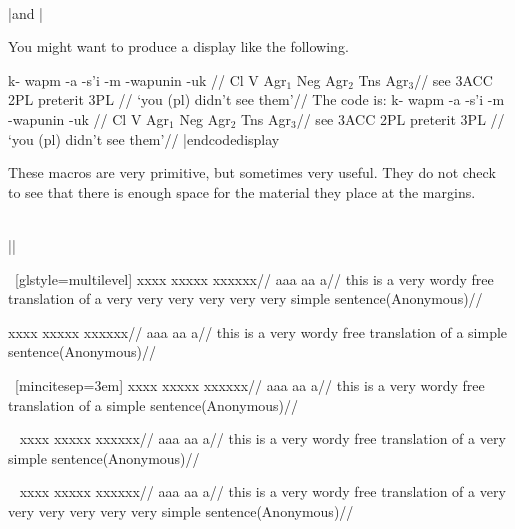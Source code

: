 \bigskip
\\ |\rightcomment and \leftcomment|\medskip

You might want to produce a display like the following.

\framedisplay
\ex[glstyle=multilevel,textoffset=1in]
\begingl
\gla \rightcomment{\rm [Potawatami]}k- wapm -a -s'i -m -wapunin -uk //
\glb {}%
   Cl V Agr$_1$ Neg Agr$_2$ Tns Agr$_3$//
 see {3\sc ACC} {} 2{\sc PL} preterit 3{\sc PL} //
\glft \leavevmode{}
   `you (pl) didn't see them'//
\endgl
\xe
\endframedisplay
The code is:
\codedisplay
\ex[glstyle=multilevel,textoffset=1.5in]
\begingl
\gla \rightcomment{\rm [Potawatami]}k- wapm -a -s'i -m -wapunin -uk //
\glb {}%
   Cl V Agr$_1$ Neg Agr$_2$ Tns Agr$_3$//
 see {3\sc ACC} {} 2{\sc PL} preterit 3{\sc PL} //
\glft \leavevmode{}
   `you (pl) didn't see them'//
\endgl
\xe
|endcodedisplay

These macros are very primitive, but sometimes very useful.  They
do not check to see that there is enough space for the material
they place at the margins.

\bigskip
\\ |\pushciteright|\medskip

\ex~[glstyle=multilevel]
\begingl
\gla xxxx xxxxx xxxxxx//
\glb aaa aa a//
\glft this is a very wordy free translation
of a very very very
very very very
simple sentence\hfill (Anonymous)//
\endgl
\xe


\ex
\begingl
\gla xxxx xxxxx xxxxxx//
\glb aaa aa a//
\glft this is a very wordy free translation
of a simple sentence\pushciteright (Anonymous)//
\endgl
\xe

\ex~[mincitesep=3em]
\begingl
\gla xxxx xxxxx xxxxxx//
\glb aaa aa a//
\glft this is a very wordy free translation
of a simple sentence\pushciteright (Anonymous)//
\endgl
\xe

\ex~
\begingl
\gla xxxx xxxxx xxxxxx//
\glb aaa aa a//
\glft this is a very wordy free translation
of a very simple sentence\pushciteright (Anonymous)//
\endgl
\xe

\ex~
\begingl
\gla xxxx xxxxx xxxxxx//
\glb aaa aa a//
\glft this is a very wordy free translation
of a very very very
very very very
simple sentence\pushciteright (Anonymous)//
\endgl
\xe









